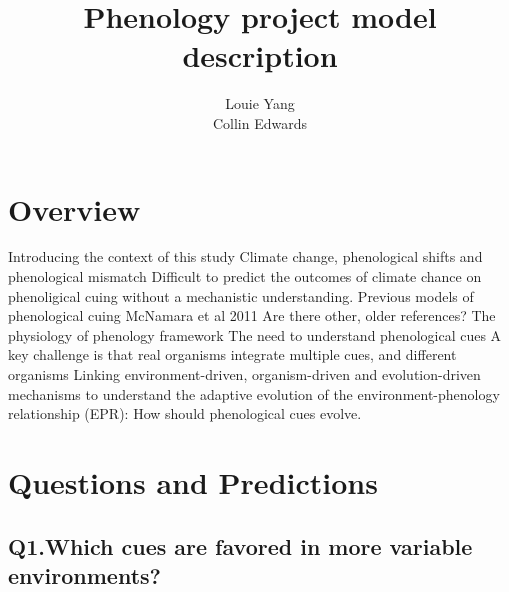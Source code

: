\documentclass[11pt,a4paper]{article}
\author{Louie Yang \\ Collin Edwards}
\title{Phenology project model description}
\begin{document}
\maketitle
\section{Overview}

\begin{outline}[enumerate]
	\1 Introducing the context of this study
		\2 Climate change, phenological shifts and phenological mismatch
			\3 Difficult to predict the outcomes of climate chance on phenoligical cuing without a mechanistic understanding. 
		\2 Previous models of phenological cuing
			\3 McNamara et al 2011
			\3 Are there other, older references?
		\2 The physiology of phenology framework
			\3 The need to understand phenological cues
			\3 A key challenge is that real organisms integrate multiple cues, and different organisms 
			\3 Linking environment-driven, organism-driven and evolution-driven mechanisms to understand the adaptive evolution of the environment-phenology relationship (EPR): How should phenological cues evolve.


\end{outline}

\section{Questions and Predictions}

\subsection{Q1.Which cues are favored in more variable environments?}
\end{document}
